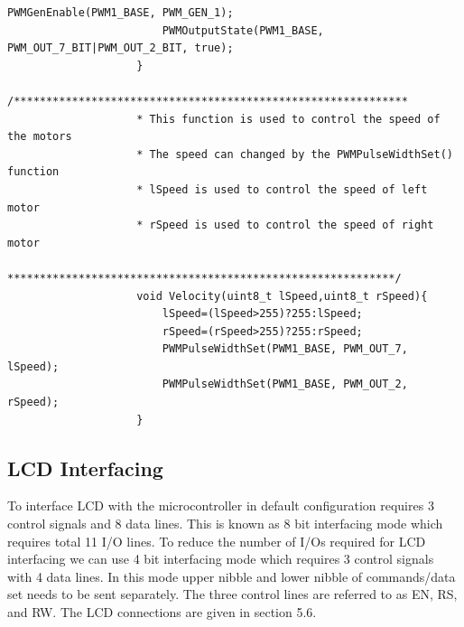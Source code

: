 \documentclass[a4paper,10pt,oneside]{article}
\begin{document}
\begin{lstlisting}[style=CStyle]
						PWMGenEnable(PWM1_BASE, PWM_GEN_1);
						PWMOutputState(PWM1_BASE, PWM_OUT_7_BIT|PWM_OUT_2_BIT, true);
					}
					/*************************************************************
					* This function is used to control the speed of the motors
					* The speed can changed by the PWMPulseWidthSet() function
					* lSpeed is used to control the speed of left motor
					* rSpeed is used to control the speed of right motor
					************************************************************/
					void Velocity(uint8_t lSpeed,uint8_t rSpeed){
						lSpeed=(lSpeed>255)?255:lSpeed;
						rSpeed=(rSpeed>255)?255:rSpeed;
						PWMPulseWidthSet(PWM1_BASE, PWM_OUT_7, lSpeed);
						PWMPulseWidthSet(PWM1_BASE, PWM_OUT_2, rSpeed);
					}
				\end{lstlisting}
				
		\subsection{\huge \textbf{LCD Interfacing}}
			{To interface LCD with the microcontroller in default configuration requires 3 control signals and 8 data lines. This is known as 8 bit interfacing mode which requires total 11 I/O lines. To reduce the number  of  I/Os  required for  LCD interfacing we can use 4 bit  interfacing mode  which requires  3 control  signals  with 4 data lines.  In this  mode upper  nibble and lower  nibble of commands/data set needs to be sent separately. The three control lines are referred to as EN, RS, and RW. The LCD connections are given in section 5.6.}
			
\end{document}
